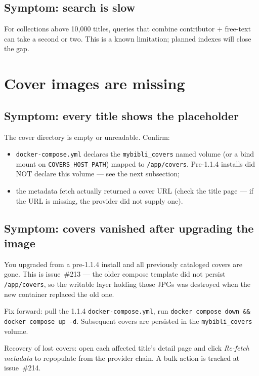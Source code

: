 \subsection*{Symptom: search is slow}

For collections above 10,000 titles, queries that combine
contributor + free-text can take a second or two. This is a known
limitation; planned indexes will close the gap.

\section{Cover images are missing}

\subsection*{Symptom: every title shows the placeholder}\label{sec:troubleshoot-covers-missing}

The cover directory is empty or unreadable. Confirm:

\begin{itemize}
  \item \texttt{docker-compose.yml} declares the
        \texttt{mybibli\_covers} named volume (or a bind mount on
        \texttt{COVERS\_HOST\_PATH}) mapped to \texttt{/app/covers}.
        Pre-1.1.4 installs did NOT declare this volume — see the
        next subsection;
  \item the metadata fetch actually returned a cover URL (check the
        title page — if the URL is missing, the provider did not
        supply one).
\end{itemize}

\subsection*{Symptom: covers vanished after upgrading the image}\label{sec:troubleshoot-covers-upgrade-loss}

You upgraded from a pre-1.1.4 install and all previously cataloged
covers are gone. This is issue~\#213 — the older compose template
did not persist \texttt{/app/covers}, so the writable layer holding
those JPGs was destroyed when the new container replaced the old
one.

Fix forward: pull the 1.1.4 \texttt{docker-compose.yml}, run
\texttt{docker compose down \&\& docker compose up -d}. Subsequent
covers are persisted in the \texttt{mybibli\_covers} volume.

Recovery of lost covers: open each affected title's detail page and
click \emph{Re-fetch metadata} to repopulate from the provider
chain. A bulk action is tracked at issue~\#214.

